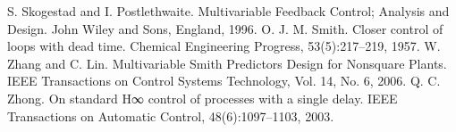 \documentclass[A4, 10pt, conference]{ieeeconf}
\begin{document}
\begin{thebibliography}{99.}
%
 S. Skogestad and I. Postlethwaite. Multivariable Feedback Control; Analysis and Design. John Wiley and Sons, England, 1996.
%
 O. J. M. Smith. Closer control of loops with dead time.
Chemical Engineering Progress, 53(5):217–219, 1957.
%
 W. Zhang and C. Lin. Multivariable Smith Predictors Design for Nonsquare Plants. IEEE Transactions on Control Systems Technology,
Vol. 14, No. 6, 2006.
%
 Q. C. Zhong. On standard H∞ control of processes with a single delay. IEEE Transactions on Automatic Control,
48(6):1097–1103, 2003.
%
%
\bigskip


\end{thebibliography}
\fi



\end{document}
